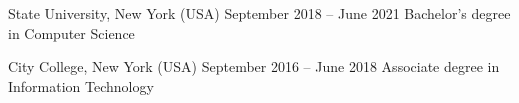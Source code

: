 %
%


\cveducation
  {State University, New York (USA)}
  {September 2018 – June 2021}
  {Bachelor's degree in Computer Science}

\cveducation
  {City College, New York (USA)}
  {September 2016 – June 2018}
  {Associate degree in Information Technology}
